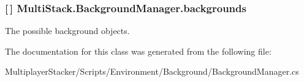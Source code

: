 \subsubsection[{backgrounds}]{ \mbox{[}$\,$\mbox{]} Multi\+Stack.\+Background\+Manager.\+backgrounds}\label{class_multi_stack_1_1_background_manager_a44be514f6a5699866194bd0d28c6deaf}


The possible background objects. 



The documentation for this class was generated from the following file\+:\begin{DoxyCompactItemize}
\item 
Multiplayer\+Stacker/\+Scripts/\+Environment/\+Background/Background\+Manager.\+cs\end{DoxyCompactItemize}
